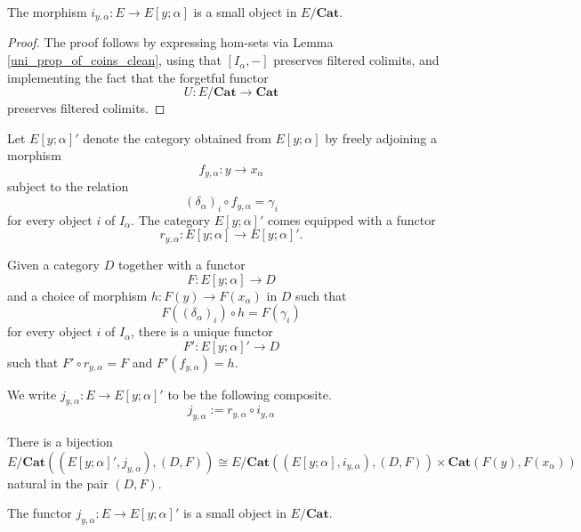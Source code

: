 \documentclass{tac}
\begin{document}
\begin{lemma}\label{coins_is_small_clean}
The morphism $i_{y,\alpha} : E \to E[y;\alpha]$ is a small object in $E/\mathbf{Cat}$.
\end{lemma}

\begin{proof}
The proof follows by expressing hom-sets via Lemma \ref{uni_prop_of_coins_clean}, using that $[I_\alpha,-]$ preserves filtered colimits, and implementing the fact that the forgetful functor 
\[
U:E/\mathbf{Cat} \to \mathbf{Cat}
\]
preserves filtered colimits.
\end{proof}


\begin{notation}
Let $E[y;\alpha]'$ denote the category obtained from $E[y;\alpha]$ by freely adjoining a morphism
\[
f_{y,\alpha} : y \to x_\alpha
\]
subject to the relation
\[
(\delta_\alpha)_i \circ f_{y,\alpha} = \gamma_i
\]
for every object $i$ of $I_\alpha$. The category $E[y;\alpha]'$ comes equipped with a functor 
\[
r_{y,\alpha}:E[y;\alpha]\to E[y;\alpha]'.
\]
\end{notation}

\begin{lemma}
Given a category $D$ together with a functor 
	\[
	F:E[y;\alpha]\to D
	\]
and a choice of morphism $h:F(y)\to F(x_\alpha)$ in $D$ such that 
	\[
	F((\delta_\alpha)_i)\circ h=F(\gamma_i)
	\]
	for every object $i$ of $I_\alpha$,
there is a unique functor 
	\[
	F':E[y;\alpha]'\to D
	\]
	such that $F'\circ r_{y,\alpha}=F$ and $F'(f_{y,\alpha})=h$.
\end{lemma}

\begin{notation}
We write $j_{y,\alpha}:E\to E[y;\alpha]'$ to be the following composite.
\[
j_{y,\alpha}:=r_{y,\alpha}\circ i_{y,\alpha}
\]
\end{notation}

\begin{lemma}\label{univ_prop_ind_map_is_fun_clean}
There is a bijection
\[
E/\mathbf{Cat}((E[y;\alpha]', j_{y,\alpha}), (D,F))
\cong
E/\mathbf{Cat}((E[y;\alpha], i_{y,\alpha}), (D,F))
\times
\mathbf{Cat}(F(y), F(x_\alpha))
\]
natural in the pair $(D,F)$.
\end{lemma}

\begin{lemma}\label{j_small_clean}
The functor $j_{y,\alpha} : E \to E[y;\alpha]'$ is a small object in $E/\mathbf{Cat}$.
\end{lemma}
\end{document}

